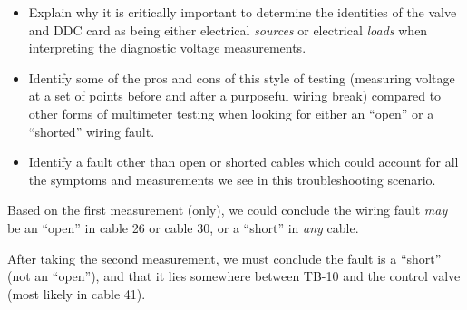 \begin{itemize}
\item{} Explain why it is critically important to determine the identities of the valve and DDC card as being either electrical {\it sources} or electrical {\it loads} when interpreting the diagnostic voltage measurements.
\item{} Identify some of the pros and cons of this style of testing (measuring voltage at a set of points before and after a purposeful wiring break) compared to other forms of multimeter testing when looking for either an ``open'' or a ``shorted'' wiring fault.
\item{} Identify a fault other than open or shorted cables which could account for all the symptoms and measurements we see in this troubleshooting scenario.
\end{itemize}








Based on the first measurement (only), we could conclude the wiring fault {\it may} be an ``open'' in cable 26 or cable 30, or a ``short'' in {\it any} cable. 







After taking the second measurement, we must conclude the fault is a ``short'' (not an ``open''), and that it lies somewhere between TB-10 and the control valve (most likely in cable 41).




